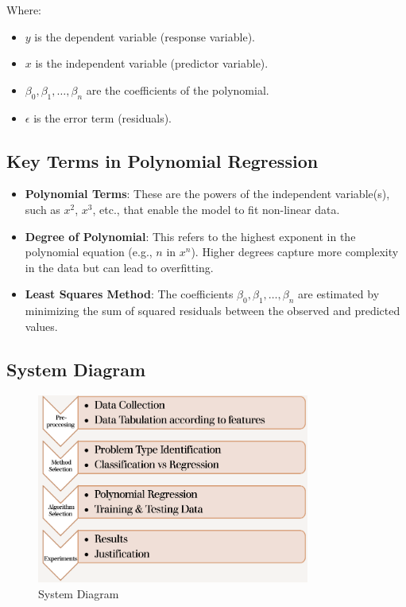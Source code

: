 \documentclass[12pt]{book} %
\begin{document}
Where:
\begin{itemize}
    \item $y$ is the dependent variable (response variable).
    \item $x$ is the independent variable (predictor variable).
    \item $\beta_0, \beta_1, \dots, \beta_n$ are the coefficients of the polynomial.
    \item $\epsilon$ is the error term (residuals).
\end{itemize}

\subsection{Key Terms in Polynomial Regression}
\begin{itemize}
    \item \textbf{Polynomial Terms}: These are the powers of the independent variable(s), such as $x^2$, $x^3$, etc., that enable the model to fit non-linear data.
    \item \textbf{Degree of Polynomial}: This refers to the highest exponent in the polynomial equation (e.g., $n$ in $x^n$). Higher degrees capture more complexity in the data but can lead to overfitting.
    \item \textbf{Least Squares Method}: The coefficients $\beta_0, \beta_1, \dots, \beta_n$ are estimated by minimizing the sum of squared residuals between the observed and predicted values.
\end{itemize}



\subsection{System Diagram}


\begin{figure}[h]
	\begin{center}
		\includegraphics[width=0.8\textwidth]{assets/sysdiagram.png} 
	\end{center}
	\caption{System Diagram} %
	\label{fig:systemdiagram}
\end{figure}
\end{document}
